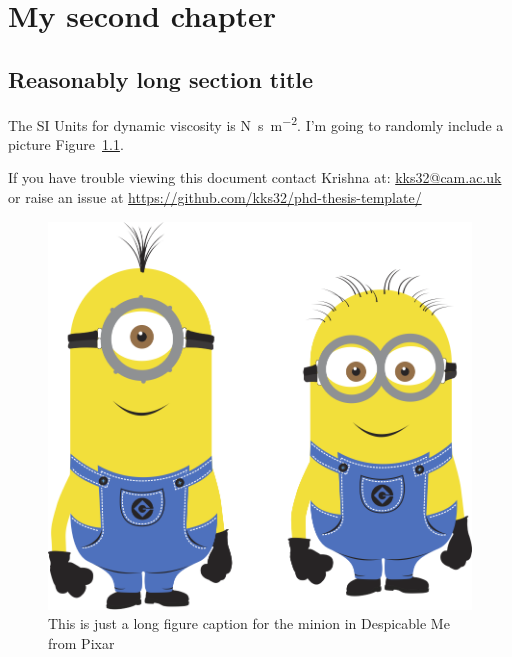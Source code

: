 
\chapter{My second chapter}

\ifpdf
    \graphicspath{{Chapter2/Figs/Raster/}{Chapter2/Figs/PDF/}{Chapter2/Figs/}}
\else
    \graphicspath{{Chapter2/Figs/Vector/}{Chapter2/Figs/}}
\fi


\section[Short title]{Reasonably long section title}

The SI Units for dynamic viscosity is \si{\newton\second\per\metre\squared}.
I'm going to randomly include a picture Figure~\ref{fig:minion}.


If you have trouble viewing this document contact Krishna at: \href{mailto:kks32@cam.ac.uk}{kks32@cam.ac.uk} or raise an issue at \url{https://github.com/kks32/phd-thesis-template/}


\begin{figure}[htbp!] 
\centering    
\includegraphics[width=1.0\textwidth]{minion}
\caption[Minion]{This is just a long figure caption for the minion in Despicable Me from Pixar}
\label{fig:minion}
\end{figure}


